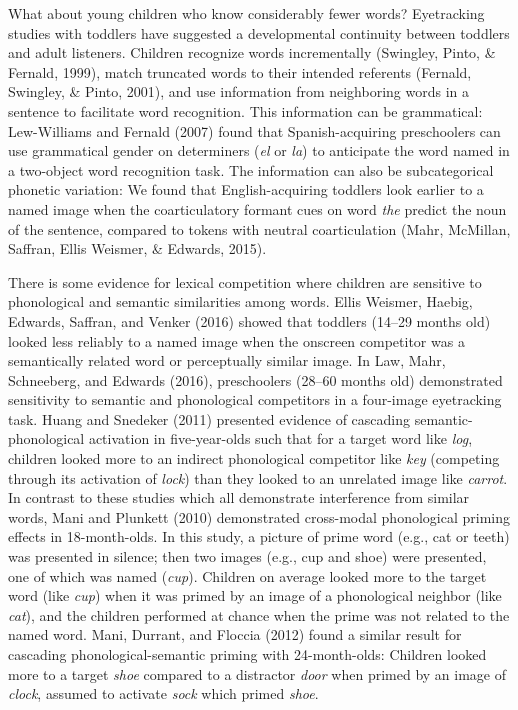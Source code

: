 \documentclass[]{book}
\theoremstyle{definition}
\theoremstyle{definition}
\theoremstyle{remark}
\begin{document}
What about young children who know considerably fewer words? Eyetracking
studies with toddlers have suggested a developmental continuity between
toddlers and adult listeners. Children recognize words incrementally
(Swingley, Pinto, \& Fernald, 1999), match truncated words to their
intended referents (Fernald, Swingley, \& Pinto, 2001), and use
information from neighboring words in a sentence to facilitate word
recognition. This information can be grammatical: Lew-Williams and
Fernald (2007) found that Spanish-acquiring preschoolers can use
grammatical gender on determiners (\emph{el} or \emph{la}) to anticipate
the word named in a two-object word recognition task. The information
can also be subcategorical phonetic variation: We found that
English-acquiring toddlers look earlier to a named image when the
coarticulatory formant cues on word \emph{the} predict the noun of the
sentence, compared to tokens with neutral coarticulation (Mahr,
McMillan, Saffran, Ellis Weismer, \& Edwards, 2015).

There is some evidence for lexical competition where children are
sensitive to phonological and semantic similarities among words. Ellis
Weismer, Haebig, Edwards, Saffran, and Venker (2016) showed that
toddlers (14--29 months old) looked less reliably to a named image when
the onscreen competitor was a semantically related word or perceptually
similar image. In Law, Mahr, Schneeberg, and Edwards (2016),
preschoolers (28--60 months old) demonstrated sensitivity to semantic
and phonological competitors in a four-image eyetracking task. Huang and
Snedeker (2011) presented evidence of cascading semantic-phonological
activation in five-year-olds such that for a target word like
\emph{log}, children looked more to an indirect phonological competitor
like \emph{key} (competing through its activation of \emph{lock}) than
they looked to an unrelated image like \emph{carrot}. In contrast to
these studies which all demonstrate interference from similar words,
Mani and Plunkett (2010) demonstrated cross-modal phonological priming
effects in 18-month-olds. In this study, a picture of prime word (e.g.,
cat or teeth) was presented in silence; then two images (e.g., cup and
shoe) were presented, one of which was named (\emph{cup}). Children on
average looked more to the target word (like \emph{cup}) when it was
primed by an image of a phonological neighbor (like \emph{cat}), and the
children performed at chance when the prime was not related to the named
word. Mani, Durrant, and Floccia (2012) found a similar result for
cascading phonological-semantic priming with 24-month-olds: Children
looked more to a target \emph{shoe} compared to a distractor \emph{door}
when primed by an image of \emph{clock}, assumed to activate \emph{sock}
which primed \emph{shoe}.
\end{document}
